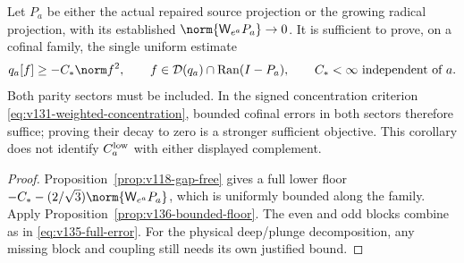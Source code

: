 \begin{corollary}
\label{cor:v136-complement-floor}
Let $P_a$ be either the actual repaired source projection or the
growing radical projection, with its established
$\norm{\mathsf W_{e^a}P_a}\to0$. It is sufficient to prove, on a
cofinal family, the single uniform estimate
\begin{equation}\label{eq:v136-complement-target}
 q_a[f]\ge-C_*\norm f^2,
 \qquad f\in\mathcal D(q_a)\cap\operatorname{Ran}(I-P_a),
 \qquad C_*<\infty\text{ independent of }a.
\end{equation}
Both parity sectors must be included. In the signed concentration
criterion \eqref{eq:v131-weighted-concentration}, bounded cofinal
errors in both sectors therefore suffice; proving their decay to zero
is a stronger sufficient objective. This corollary does not identify
$C_a^{\rm low}$ with either displayed complement.
\end{corollary}
\begin{proof}
Proposition~\ref{prop:v118-gap-free} gives a full lower floor
$-C_*-(2/\sqrt3)\norm{\mathsf W_{e^a}P_a}$, which is uniformly
bounded along the family. Apply Proposition~\ref{prop:v136-bounded-floor}.
The even and odd blocks combine as in \eqref{eq:v135-full-error}.
For the physical deep/plunge decomposition, any missing block and
coupling still needs its own justified bound.
\end{proof}

